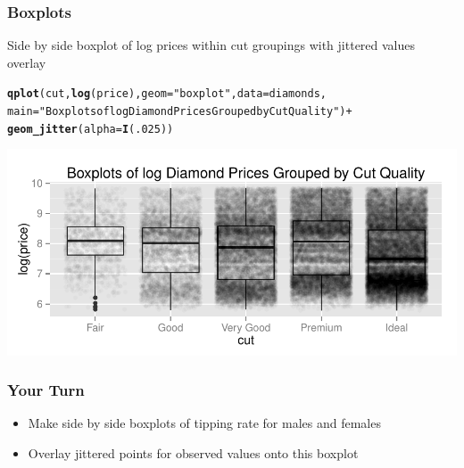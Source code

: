 \documentclass{beamer}\usepackage[]{graphicx}\usepackage[]{color}
\makeatletter
\newcommand{\hlnum}[1]{\textcolor[rgb]{0.686,0.059,0.569}{#1}}%
\newcommand{\hlstr}[1]{\textcolor[rgb]{0.192,0.494,0.8}{#1}}%
\newcommand{\hlopt}[1]{\textcolor[rgb]{0,0,0}{#1}}%
\newcommand{\hlstd}[1]{\textcolor[rgb]{0.345,0.345,0.345}{#1}}%
\newcommand{\hlkwc}[1]{\textcolor[rgb]{0.333,0.667,0.333}{#1}}%
\newcommand{\hlkwd}[1]{\textcolor[rgb]{0.737,0.353,0.396}{\textbf{#1}}}%
\newenvironment{kframe}{%
 \def\at@end@of@kframe{}%
 \ifinner\ifhmode%
  \def\at@end@of@kframe{\end{minipage}}%
  \begin{minipage}{\columnwidth}%
 \fi\fi%
 \def\FrameCommand##1{\hskip\@totalleftmargin \hskip-\fboxsep
 \colorbox{shadecolor}{##1}\hskip-\fboxsep
     \hskip-\linewidth \hskip-\@totalleftmargin \hskip\columnwidth}%
 \MakeFramed {\advance\hsize-\width
   \@totalleftmargin\z@ \linewidth\hsize
   \@setminipage}}%
 {\par\unskip\endMakeFramed%
 \at@end@of@kframe}
\newenvironment{knitrout}{}{} %
\makeatother
\begin{document}
\begin{frame}[fragile]
\frametitle{Boxplots}
    
    Side by side boxplot of log prices within cut groupings with jittered values overlay
    
\footnotesize
\begin{knitrout}\scriptsize
{}\color{fgcolor}\begin{kframe}
\begin{alltt}
\hlkwd{qplot}\hlstd{(cut,} \hlkwd{log}\hlstd{(price),} \hlkwc{geom}\hlstd{=}\hlstr{"boxplot"}\hlstd{,} \hlkwc{data}\hlstd{=diamonds,}
        \hlkwc{main}\hlstd{=}\hlstr{"Boxplots of log Diamond Prices Grouped by Cut Quality"}\hlstd{)} \hlopt{+}
        \hlkwd{geom_jitter}\hlstd{(}\hlkwc{alpha}\hlstd{=}\hlkwd{I}\hlstd{(}\hlnum{.025}\hlstd{))}
\end{alltt}
\end{kframe}

{\centering \includegraphics[width=.9\linewidth]{figure/kdiamondbox2} 

}



\end{knitrout}
\normalsize
\end{frame}


\begin{frame}
\frametitle{Your Turn}

\begin{itemize}
  \item Make side by side boxplots of tipping rate for males and females\medskip
  \item Overlay jittered points for observed values onto this boxplot
\end{itemize}

\end{frame}
\end{document}
